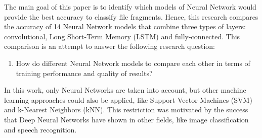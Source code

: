 The main goal of this paper is to identify which models of Neural Network would provide the best accuracy to classify file fragments. Hence, this research compares the accuracy of 14 Neural Network models that combine three types of layers: convolutional, Long Short-Term Memory (LSTM) and fully-connected. This comparison is an attempt to answer the following research question:

\begin{enumerate}[itemindent=\parindent,label=\textbf{Q\arabic*.}]

    \item How do different Neural Network models to compare each other in terms of training performance and quality of results?
    
\end{enumerate}

In this work, only Neural Networks are taken into account, but other machine learning approaches could also be applied, like Support Vector Machines (SVM) and k-Nearest Neighbors (kNN). This restriction was motivated by the success that Deep Neural Networks have shown in other fields, like image classification and speech recognition.


